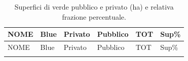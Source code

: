 \documentclass[
  a4paper,
]{book}
\begin{document}
\begin{longtable}[]{@{}
  >{\raggedright\arraybackslash}p{}
  >{\raggedleft\arraybackslash}p{}
  >{\raggedleft\arraybackslash}p{}
  >{\raggedleft\arraybackslash}p{}
  >{\raggedleft\arraybackslash}p{}
  >{\raggedleft\arraybackslash}p{}@{}}
\caption{\label{tab:verdeFraz} Superfici di verde pubblico e privato (ha) e relativa frazione percentuale.}\tabularnewline
\toprule\noalign{}
\begin{minipage}[b]{\linewidth}\raggedright
NOME
\end{minipage} & \begin{minipage}[b]{\linewidth}\raggedleft
Blue
\end{minipage} & \begin{minipage}[b]{\linewidth}\raggedleft
Privato
\end{minipage} & \begin{minipage}[b]{\linewidth}\raggedleft
Pubblico
\end{minipage} & \begin{minipage}[b]{\linewidth}\raggedleft
TOT
\end{minipage} & \begin{minipage}[b]{\linewidth}\raggedleft
Sup\%
\end{minipage} \\
\midrule\noalign{}
\endfirsthead
\toprule\noalign{}
\begin{minipage}[b]{\linewidth}\raggedright
NOME
\end{minipage} & \begin{minipage}[b]{\linewidth}\raggedleft
Blue
\end{minipage} & \begin{minipage}[b]{\linewidth}\raggedleft
Privato
\end{minipage} & \begin{minipage}[b]{\linewidth}\raggedleft
Pubblico
\end{minipage} & \begin{minipage}[b]{\linewidth}\raggedleft
TOT
\end{minipage} & \begin{minipage}[b]{\linewidth}\raggedleft
Sup\%
\end{minipage} \\
\midrule\noalign{}
\endhead
\bottomrule\noalign{}

\end{longtable}
\end{document}
